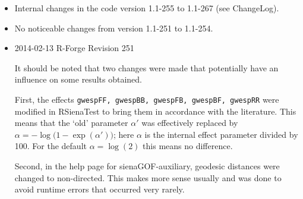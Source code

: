 \documentclass[a4paper,fleqn,11pt]{article}
\newcommand{\+}{\, + \,}
\newcommand{\sfn}[1]{\textsf{#1}}
\begin{document}
{\begin{small}
\begin{itemize}
Changes in RSiena and RSienaTest:
\begin{itemize}
\item Added function \sfn{sienaRI()} for assessment of relative importance of effects,
      with print and plot methods.
\item In \sfn{coDyadCovar()} and \sfn{varDyadCovar()}, centering now also is
      optional by the new option \texttt{centered} (like it was done for
      \sfn{coCovar()} and \sfn{varCovar()} in revision 1.1-251).
\item Corrected bug when printing siena object with a symmetric network;
     and in \sfn{varDyadCovar()} corrected a bug occurring when calling it
     with a named list.
\item Added standard errors as component \texttt{se} to \texttt{sienaFit}
     objects.
\end{itemize}


\item Internal changes in the code version 1.1-255 to 1.1-267 (see \sfn{ChangeLog}).

\item No noticeable changes from version 1.1-251 to 1.1-254.

\item 2014-02-13 R-Forge Revision 251

It should be noted that two changes were made that potentially
have an influence on some results obtained.

First, the effects \texttt{gwespFF, gwespBB, gwespFB, gwespBF, gwespRR}
were modified in RSienaTest to bring them in accordance with the literature.
This means that the `old' parameter $\alpha'$ was effectively replaced by
$\alpha = -\log\big(1-\exp(\alpha')\big)$; here $\alpha$ is the internal
effect parameter divided by 100. For the default $\alpha = \log(2)$
this means no difference.

Second, in the help page for \sfn{sienaGOF-auxiliary}, geodesic distances
were changed to non-directed. This makes more sense usually and was done to
avoid runtime errors that occurred very rarely.


\end{itemize}
\end{small}}
\end{document}
